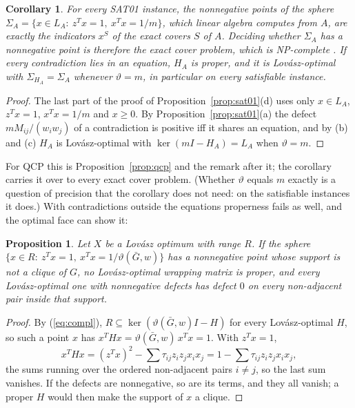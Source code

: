 \documentclass[11pt]{article}
\newtheorem{prop}[thm]{Proposition}
\newtheorem{cor}[thm]{Corollary}
\theoremstyle{definition}
\theoremstyle{remark}
\newcommand{\vt}{\vartheta(\bar G,w)}
\begin{document}
\begin{cor}
\label{cor:exactcover}
For every SAT01 instance, the nonnegative points of the sphere
$\Sigma_A=\{x\in L_A:\ z^Tx=1,\ x^Tx=1/m\}$, which linear algebra computes
from $A$, are exactly the indicators $x^S$ of the exact covers $S$ of $A$.
Deciding whether $\Sigma_A$ has a nonnegative point is therefore the exact
cover problem, which is NP-complete \cite{Ka72}. If every contradiction
lies in an equation, $H_A$ is proper, and it is Lov\'asz-optimal with
$\Sigma_{H_A}=\Sigma_A$ whenever $\vartheta=m$, in particular on every
satisfiable instance.
\end{cor}
\begin{proof}
The last part of the proof of Proposition~\ref{prop:sat01}(d) uses only
$x\in L_A$, $z^Tx=1$, $x^Tx=1/m$ and $x\geq0$. By
Proposition~\ref{prop:sat01}(a) the defect $mM_{ij}/(w_iw_j)$ of a
contradiction is positive iff it shares an equation, and by (b) and (c)
$H_A$ is Lov\'asz-optimal with $\ker(mI-H_A)=L_A$ when $\vartheta=m$.
\end{proof}

For QCP this is Proposition~\ref{prop:qcp} and the remark after it; the
corollary carries it over to every exact cover problem. (Whether $\vartheta$
equals $m$ exactly is a question of precision that the corollary does not
need: on the satisfiable instances it does.) With contradictions outside the
equations properness fails as well, and the optimal face can show it:

\begin{prop}
\label{prop:improper}
Let $X$ be a Lov\'asz optimum with range $R$. If the sphere
$\{x\in R:\ z^Tx=1,\ x^Tx=1/\vt\}$ has a nonnegative point whose support is
not a clique of $G$, no Lov\'asz-optimal wrapping matrix is proper, and
every Lov\'asz-optimal one with nonnegative defects has defect $0$ on every
non-adjacent pair inside that support.
\end{prop}
\begin{proof}
By (\ref{eq:compl}), $R\subseteq\ker(\vt I-H)$ for every Lov\'asz-optimal
$H$, so such a point $x$ has $x^THx=\vt\,x^Tx=1$. With $z^Tx=1$,
\[ x^THx=(z^Tx)^2-\sum\tau_{ij}z_iz_jx_ix_j
        =1-\sum\tau_{ij}z_iz_jx_ix_j, \]
the sums running over the ordered non-adjacent pairs $i\neq j$, so the last
sum vanishes. If the defects are nonnegative, so are its terms, and they all
vanish; a proper $H$ would then make the support of $x$ a clique.
\end{proof}
\end{document}
